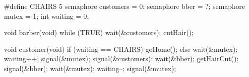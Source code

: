\documentclass[varwidth=10.8cm,crop]{standalone}
\begin{document}
\begin{minipage}[t]{.42\linewidth}
\begin{ccode}
#define CHAIRS 5
semaphore customers = 0;
semaphore bber = ?; 
semaphore mutex = 1;
int waiting = 0;

void barber(void)
{
  while (TRUE) {
    wait(&customers);
    cutHair();
  }
}      
\end{ccode}
\end{minipage}\qquad
\begin{minipage}[t]{.48\linewidth}
\begin{ccode}
void customer(void)
{
  if (waiting == CHAIRS)
    goHome();
  else {
    wait(&mutex);
    waiting++;
    signal(&mutex);
    signal(&customers);
    wait(&bber);
    getHairCut();
    signal(&bber);
    wait(&mutex);
      waiting--;
    signal(&mutex);
  }
}      
\end{ccode}
\end{minipage}
\end{document}
